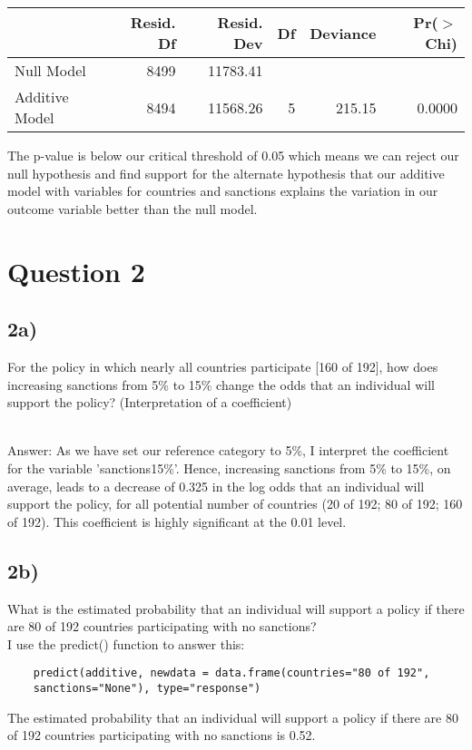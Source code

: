 \documentclass{article}
\begin{document}
\begin{table}[ht]
\centering
\begin{tabular}{lrrrrr}
  \hline
 & Resid. Df & Resid. Dev & Df & Deviance & Pr($>$Chi) \\ 
  \hline
Null Model & 8499 & 11783.41 &  &  &  \\ 
  Additive Model & 8494 & 11568.26 & 5 & 215.15 & 0.0000 \\ 
   \hline
\end{tabular}
\end{table}

The p-value is below our critical threshold of 0.05 which means we can reject our null hypothesis and find support for the alternate hypothesis that our additive model with variables for countries and sanctions explains the variation in our outcome variable better than the null model. 

\section{Question 2}

\subsection{2a)}
For the policy in which nearly all countries participate [160 of 192], how does increasing sanctions from 5\% to 15\% change the odds that an individual will support the policy? (Interpretation of a coefficient)

\\
Answer: As we have set our reference category to 5\%, I interpret the coefficient for the variable 'sanctions15\%'. Hence, increasing sanctions from 5\% to 15\%, on average, leads to a decrease of 0.325 in the log odds that an individual will support the policy, for all potential number of countries (20 of 192; 80 of 192; 160 of 192). This coefficient is highly significant at the 0.01 level. 

\subsection{2b)}
What is the estimated probability that an individual will support a policy if there are 80 of 192 countries participating with no sanctions?
\\

I use the predict() function to answer this:
\begin{verbatim}
    predict(additive, newdata = data.frame(countries="80 of 192",
    sanctions="None"), type="response")
\end{verbatim}
The estimated probability that an individual will support a policy if there
are 80 of 192 countries participating with no sanctions is 0.52.
\end{document}

